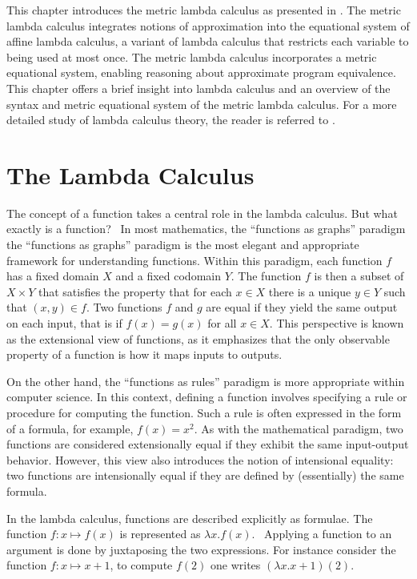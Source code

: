 This chapter introduces the metric lambda calculus as presented in \cite{dahlqvist2022syntactic}. The metric lambda calculus integrates notions of
approximation into the equational system of affine lambda calculus, a variant of lambda calculus that restricts each variable to being used at most once. The metric lambda calculus incorporates a metric equational system, enabling reasoning about approximate program equivalence. This chapter offers a brief insight into lambda calculus and an overview of the syntax and metric equational system of the metric lambda calculus. For a more detailed study of lambda calculus theory, the reader is referred to \cite{barendregt1984lambda}.


\section{The Lambda Calculus}

The concept of a function takes a central role in the lambda calculus. But what exactly is a function?  In most mathematics, the “functions as graphs” paradigm the “functions as graphs” paradigm is the most elegant and appropriate framework for understanding functions. Within this paradigm, each function $f$ has a fixed domain $X$ and a fixed codomain $Y$. The function $f$ is then a subset of $X \times Y$ that satisfies the property that for each $x \in X$ there is a unique $y \in Y$ such that $(x,y) \in f$. Two functions $f$ and $g$ are equal if they yield the same output on each input, that is if $f(x) = g(x)$ for all $x \in X$. This perspective is known as the extensional view of functions, as it emphasizes that the only observable property of a function is how it maps inputs to outputs.

On the other hand, the “functions as rules” paradigm is more appropriate within computer science. In this context, defining a function involves specifying a rule or procedure for computing the function. Such a rule is often expressed in the form of a formula, for example, \( f(x) = x^2 \). As with the mathematical paradigm, two functions are considered extensionally equal if they exhibit the same input-output behavior. However, this view also introduces the notion of intensional equality: two functions are intensionally equal if they are defined by (essentially) the same formula.


In the lambda calculus, functions are described explicitly as formulae. The function $f:x \mapsto f(x)$ is represented as $\lambda x.f(x)$.  Applying a function to an argument is done by juxtaposing the two expressions. For instance consider the function $f:x \mapsto x+1$, to compute $f(2)$ one writes $(\lambda x.x+1)(2)$.

